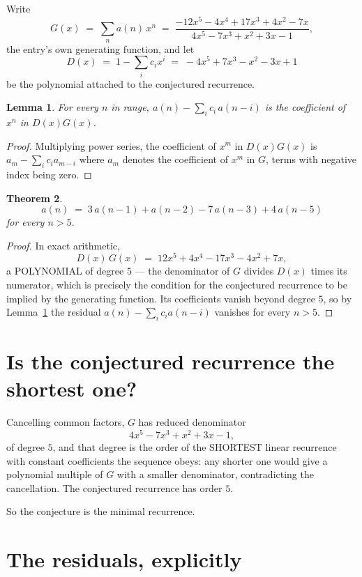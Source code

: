 \documentclass[11pt,a4paper]{article}
\theoremstyle{plain}
\newtheorem{theorem}{Theorem}
\newtheorem{lemma}[theorem]{Lemma}
\theoremstyle{definition}
\begin{document}
Write
\[
G(x)\;=\;\sum_{n}a(n)\,x^{n}\;=\;\frac{- 12 x^{5} - 4 x^{4} + 17 x^{3} + 4 x^{2} - 7 x}{4 x^{5} - 7 x^{3} + x^{2} + 3 x - 1},
\]
the entry's own generating function, and let
\[
D(x)\;=\;1-\sum_i c_i x^{i}\;=\;- 4 x^{5} + 7 x^{3} - x^{2} - 3 x + 1
\]
be the polynomial attached to the conjectured recurrence.

\begin{lemma}\label{lem:key}
For every $n$ in range, $a(n)-\sum_i c_i\,a(n-i)$ is the coefficient of $x^{n}$ in
$D(x)G(x)$.
\end{lemma}

\begin{proof}
Multiplying power series, the coefficient of $x^{m}$ in $D(x)G(x)$ is
$a_m-\sum_i c_i a_{m-i}$ where $a_m$ denotes the coefficient of $x^{m}$ in $G$, terms with
negative index being zero.
\end{proof}

\begin{theorem}
\[
a(n)\;=\;3\,a(n-1) + a(n-2) - 7\,a(n-3) + 4\,a(n-5)
\]
for every $n>5$.
\end{theorem}

\begin{proof}
In exact arithmetic,
\[
D(x)\,G(x)\;=\;12 x^{5} + 4 x^{4} - 17 x^{3} - 4 x^{2} + 7 x,
\]
a POLYNOMIAL of degree $5$ --- the denominator of $G$ divides $D(x)$ times its numerator,
which is precisely the condition for the conjectured recurrence to be implied by the
generating function. Its coefficients vanish beyond degree $5$, so by
Lemma~\ref{lem:key} the residual $a(n)-\sum_ic_ia(n-i)$ vanishes for every
$n>5$.
\end{proof}

\section{Is the conjectured recurrence the shortest one?}

Cancelling common factors, $G$ has reduced denominator
\[
4 x^{5} - 7 x^{3} + x^{2} + 3 x - 1,
\]
of degree $5$, and that degree is the order of the SHORTEST linear recurrence with
constant coefficients the sequence obeys: any shorter one would give a polynomial multiple of
$G$ with a smaller denominator, contradicting the cancellation. The conjectured recurrence has
order $5$.

So the conjecture is the minimal recurrence.

\section{The residuals, explicitly}
\end{document}
